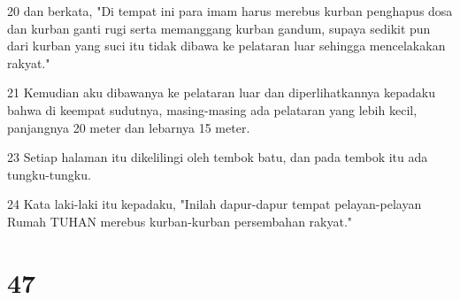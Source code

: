 \par 20 dan berkata, "Di tempat ini para imam harus merebus kurban penghapus dosa dan kurban ganti rugi serta memanggang kurban gandum, supaya sedikit pun dari kurban yang suci itu tidak dibawa ke pelataran luar sehingga mencelakakan rakyat."
\par 21 Kemudian aku dibawanya ke pelataran luar dan diperlihatkannya kepadaku bahwa di keempat sudutnya, masing-masing ada pelataran yang lebih kecil, panjangnya 20 meter dan lebarnya 15 meter.
\par 23 Setiap halaman itu dikelilingi oleh tembok batu, dan pada tembok itu ada tungku-tungku.
\par 24 Kata laki-laki itu kepadaku, "Inilah dapur-dapur tempat pelayan-pelayan Rumah TUHAN merebus kurban-kurban persembahan rakyat."

\chapter{47}

